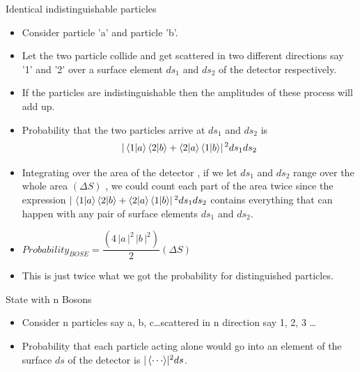 \documentclass[aspectratio=169]{beamer}
\begin{document}
\begin{frame}{Identical indistinguishable particles}
	\begin{itemize}
		\item Consider particle 'a' and particle 'b'. \pause \newline
		\item Let the two particle collide and get scattered in two different directions say '1' and '2' over a surface element $ds_{1}$ and $ds_{2}$ of the detector respectively. \pause \newline
		\item If the particles are indistinguishable then the amplitudes of these process will add up. \pause \newline
		\item Probability that the two particles arrive at $ds_{1}$ and $ds_{2}$ is \pause \newline
		\[\rvert\braket{1|a}\braket{2|b} + \braket{2|a}\braket{1|b}\rvert\,^{2} ds_{1} ds_{2}\]
		
	\end{itemize}
\end{frame}

\begin{frame}
	\begin{itemize}
		\item Integrating over the area of the detector ,  if we let $ds_{1}$ and $ds_{2}$ range over the whole area $(\Delta S)$ , we could count each part of the area twice since the expression $\rvert\,\braket{1|a}\braket{2|b} + \braket{2|a}\braket{1|b}\rvert\,^{2} ds_{1} ds_{2}$ contains everything that can happen with any pair of surface elements $ds_{1}$ and $ds_{2}$. \pause \newline
		\item $ Probability_{BOSE} = \dfrac{ \left(4\,\rvert a \,\rvert^{2} \,\rvert b \,\rvert^{2}\right)}{2} \left(\Delta S\right)$ \pause \newline
		\item This is just twice what we got the probability for distinguished particles. 

	\end{itemize}
\end{frame}

\begin{frame}{State with n Bosons}
	\begin{itemize}
		\item Consider n particles say a, b, c\ldots scattered in n direction say 1, 2, 3 \ldots \pause \newline
		\item Probability that each particle acting alone would go into an element of the surface $ds$ of the detector is $\rvert \braket{ \cdots }\rvert^{2} ds$.
	\end{itemize}
\end{frame} 
\end{document}
